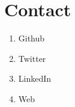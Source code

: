 \section*{Contact}
\begin{enumerate}
  \item Github
  \item Twitter
  \item LinkedIn
  \item Web
\end{enumerate}